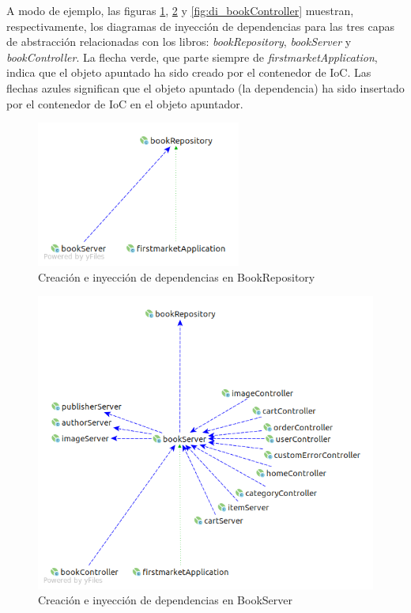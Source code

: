 \documentclass[a4paper,12pt,twoside,openright]{report}
\begin{document}
    A modo de ejemplo, las figuras \ref{fig:di_bookRepository}, \ref{fig:di_bookServer} y \ref{fig:di_bookController} muestran, respectivamente, los diagramas de inyección de dependencias para las tres capas de abstracción relacionadas con los libros: \emph{bookRepository}, \emph{bookServer} y \emph{bookController}. La flecha verde, que parte siempre de \emph{firstmarketApplication}, indica que el objeto apuntado ha sido creado por el contenedor de IoC. Las flechas azules significan que el objeto apuntado (la dependencia) ha sido insertado por el contenedor de IoC en el objeto apuntador.

	\begin{figure}[htb!]
		\centering
		\includegraphics[width=0.6\textwidth]{di_bookRepository}
		\caption{Creación e inyección de dependencias en BookRepository}
		\label{fig:di_bookRepository}
	\end{figure}

	\begin{figure}[htb!]
		\centering
		\includegraphics[width=\textwidth]{di_bookServer}
		\caption{Creación e inyección de dependencias en BookServer}
		\label{fig:di_bookServer}
	\end{figure}
\end{document}
